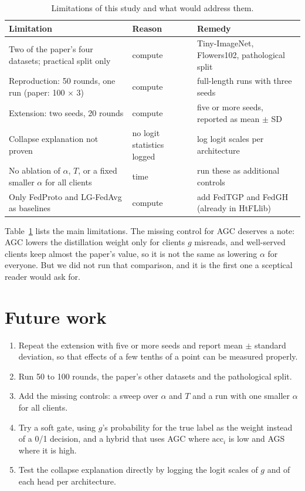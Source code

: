 \begin{table}[htbp]
\centering
\caption[Limitations and remedies]{Limitations of this study and what would address them.}
\label{tab:limits}
\small
\begin{tabularx}{\textwidth}{>{\raggedright\arraybackslash}X>{\raggedright\arraybackslash}p{3.4cm}>{\raggedright\arraybackslash}X}
\toprule
Limitation & Reason & Remedy \\
\midrule
Two of the paper's four datasets; practical split only & compute & Tiny-ImageNet, Flowers102, pathological split \\
Reproduction: 50 rounds, one run (paper: 100 $\times$ 3) & compute & full-length runs with three seeds \\
Extension: two seeds, 20 rounds & compute & five or more seeds, reported as mean $\pm$ SD \\
Collapse explanation not proven & no logit statistics logged & log logit scales per architecture \\
No ablation of $\alpha$, $T$, or a fixed smaller $\alpha$ for all clients & time & run these as additional controls \\
Only FedProto and LG-FedAvg as baselines & compute & add FedTGP and FedGH (already in HtFLlib) \\
\bottomrule
\end{tabularx}
\end{table}

Table~\ref{tab:limits} lists the main limitations. The missing control for AGC deserves a note: AGC lowers the distillation weight only for clients $g$ misreads, and well-served clients keep almost the paper's value, so it is not the same as lowering $\alpha$ for everyone. But we did not run that comparison, and it is the first one a sceptical reader would ask for.

\section{Future work}

\begin{enumerate}
\item Repeat the extension with five or more seeds and report mean $\pm$ standard deviation, so that effects of a few tenths of a point can be measured properly.
\item Run 50 to 100 rounds, the paper's other datasets and the pathological split.
\item Add the missing controls: a sweep over $\alpha$ and $T$ and a run with one smaller $\alpha$ for all clients.
\item Try a soft gate, using $g$'s probability for the true label as the weight instead of a 0/1 decision, and a hybrid that uses AGC where $\mathrm{acc}_i$ is low and AGS where it is high.
\item Test the collapse explanation directly by logging the logit scales of $g$ and of each head per architecture.
\end{enumerate}

